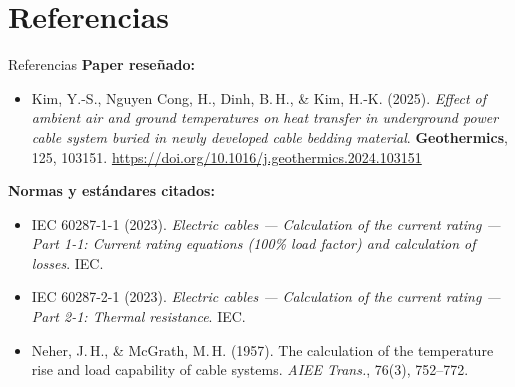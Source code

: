 \documentclass[aspectratio=169]{beamer}
\begin{document}
\section{Referencias}

\begin{frame}[allowframebreaks]{Referencias}
\footnotesize
\textbf{Paper reseñado:}
\begin{itemize}[leftmargin=*]
  \item Kim, Y.-S., Nguyen Cong, H., Dinh, B.\,H., \& Kim, H.-K.
        (2025). \textit{Effect of ambient air and ground temperatures on
        heat transfer in underground power cable system buried in newly
        developed cable bedding material}. \textbf{Geothermics}, 125,
        103151. \url{https://doi.org/10.1016/j.geothermics.2024.103151}
\end{itemize}

\vspace{0.5em}
\textbf{Normas y estándares citados:}
\begin{itemize}[leftmargin=*]
  \item IEC 60287-1-1 (2023). \textit{Electric cables --- Calculation of
        the current rating --- Part 1-1: Current rating equations
        (100\% load factor) and calculation of losses}. IEC.
  \item IEC 60287-2-1 (2023). \textit{Electric cables --- Calculation of
        the current rating --- Part 2-1: Thermal resistance}. IEC.
  \item Neher, J.\,H., \& McGrath, M.\,H. (1957). The calculation of
        the temperature rise and load capability of cable systems.
        \textit{AIEE Trans.}, 76(3), 752--772.
\end{itemize}


\end{frame}
\end{document}
